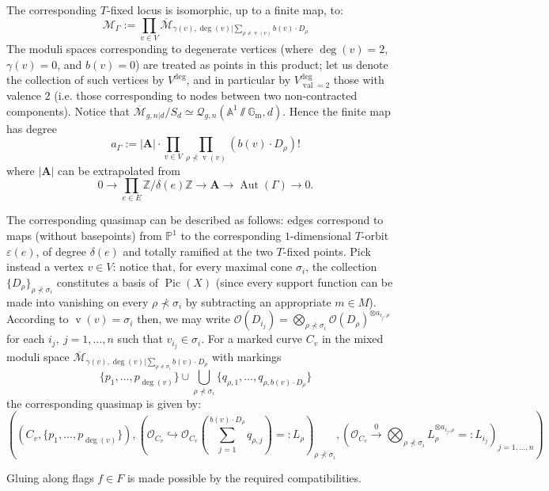 \documentclass[11pt]{amsart}
\newcommand{\Q}[4]{\mathcal{Q}_{#1,#2}(#3,#4)}
\newcommand{\PP}{\mathbb P}
\newcommand{\OO}{\mathcal{O}}
\renewcommand{\to}{\rightarrow}
\newcommand{\Aaff}{\mathbb{A}}
\newcommand{\Pic}{\operatorname{Pic}}
\newcommand{\val}{\operatorname{val}}
\newcommand{\Gm}{\mathbb{G}_{\text{m}}}
\newcommand{\ZZ}{\mathbb{Z}}
\newcommand{\vv}{\operatorname{v}}
\newcommand{\Aut}{\operatorname{Aut}}
\theoremstyle{definition}
\theoremstyle{definition}
\begin{document}
The corresponding $T$-fixed locus is isomorphic, up to a finite map, to:
\[
 \mathcal M_\Gamma:= \prod_{v\in V} \overline{\mathcal M}_{\gamma(v),\deg(v)|\sum_{\rho\nprec \vv(v)}b(v)\cdot D_\rho}
\]
The moduli spaces corresponding to degenerate vertices (where $\deg(v)=2$, $\gamma(v)=0$, and $b(v)=0$) are treated as points in this product; let us denote the collection of such vertices by $V^{\text{deg}}$, and in particular by $V^{\text{deg}}_{\val=2}$ those with valence $2$ (i.e. those corresponding to nodes between two non-contracted components). Notice that $\overline{\mathcal M}_{g,n|d}/S_d\simeq\Q{g}{n}{\Aaff^1\sslash\Gm}{d}$. Hence the finite map has degree \[a_\Gamma:=|\mathbf A|\cdot\prod_{v\in V}\prod_{\rho\nprec\vv(v)}(b(v)\cdot D_\rho)!\] where $|\mathbf A|$ can be extrapolated from
\[
 0\to\prod_{e\in E}\ZZ/\delta(e)\ZZ\to \mathbf A\to \Aut(\Gamma)\to 0.
\]

The corresponding quasimap can be described as follows: edges correspond to maps (without basepoints) from $\PP^1$ to the corresponding $1$-dimensional $T$-orbit $\varepsilon(e)$, of degree $\delta(e)$ and totally ramified at the two $T$-fixed points. Pick instead a vertex $v\in V$: notice that, for every maximal cone $\sigma_i$, the collection $\{D_\rho\}_{\rho\nprec\sigma_i}$ constitutes a basis of $\Pic(X)$ (since every support function can be made into vanishing on every $\rho\nprec\sigma_i$ by subtracting an appropriate $m\in M$). According to $\vv(v)=\sigma_i$ then, we may write $\OO(D_{i_j})=\bigotimes_{\rho\nprec\sigma_i} \OO(D_\rho)^{\otimes a_{i_j,\rho}}$ for each $i_j,\ j=1,\ldots,n$ such that $v_{i_j}\in \sigma_i$. For a marked curve $C_v$ in the mixed moduli space $\overline{\mathcal M}_{\gamma(v),\deg(v)|\sum_{\rho\nprec \sigma_i}b(v)\cdot D_\rho}$ with markings
\[
 \{p_1,\ldots,p_{\deg(v)}\}\cup\bigcup_{\rho\nprec\sigma_i}\{q_{\rho,1},\ldots,q_{\rho,b(v)\cdot D_{\rho}}\}
\]
the corresponding quasimap is given by:
\[
 \left((C_v,\{p_1,\ldots,p_{\deg(v)}\}),(\mathcal O_{C_v}\hookrightarrow\OO_{C_v}(\sum_{j=1}^{b(v)\cdot D_{\rho} }q_{\rho,j})=:L_\rho)_{\rho\nprec\sigma_i},(\mathcal O_{C_v}\xrightarrow{0}\bigotimes_{\rho\nprec\sigma_i} L_\rho^{\otimes a_{i_j,\rho}}=:L_{i_j})_{j=1,\ldots,n} \right)
\]

Gluing along flags $f\in F$ is made possible by the required compatibilities.
\end{document}
